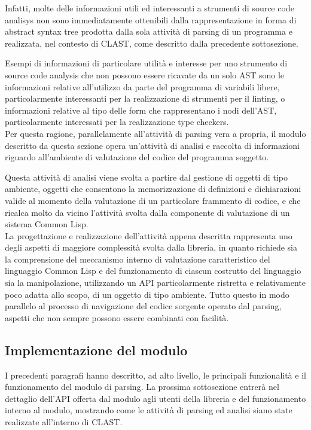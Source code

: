 Infatti, molte delle informazioni utili ed interessanti a strumenti di source
code analisys non sono immediatamente ottenibili dalla rappresentazione in forma
di abstract syntax tree prodotta dalla sola attività di parsing di un programma
e realizzata, nel contesto di CLAST, come descritto dalla precedente
sottosezione.

Esempi di informazioni di particolare utilità e interesse per uno strumento di
source code analysis che non possono essere ricavate da un solo AST sono le
informazioni relative all'utilizzo da parte del programma di variabili libere,
particolarmente interessanti per la realizzazione di strumenti per il linting, o
informazioni relative al tipo delle form che rappresentano i nodi dell'AST,
particolarmente interessati per la realizzazione type checkers.\\

Per questa ragione, parallelamente all'attività di parsing vera a propria, il
modulo descritto da questa sezione opera un'attività di analisi e raccolta di
informazioni riguardo all'ambiente di valutazione del codice del programma
soggetto.

Questa attività di analisi viene svolta a partire dal gestione di oggetti di
tipo ambiente, oggetti che consentono la memorizzazione di definizioni e
dichiarazioni valide al momento della valutazione di un particolare frammento di
codice, e che ricalca molto da vicino l’attività svolta dalla componente di
valutazione di un sistema Common Lisp.\\

La progettazione e realizzazione dell'attività appena descritta rappresenta uno
degli aspetti di maggiore complessità svolta dalla libreria, in quanto richiede
sia la comprensione del meccanismo interno di valutazione caratteristico del
linguaggio Common Lisp e del funzionamento di ciascun costrutto del linguaggio
sia la manipolazione, utilizzando un API particolarmente ristretta e
relativamente poco adatta allo scopo, di un oggetto di tipo ambiente. Tutto
questo in modo parallelo al processo di navigazione del codice sorgente operato
dal parsing, aspetti che non sempre possono essere combinati con facilità.

\subsection{Implementazione del modulo}

I precedenti paragrafi hanno descritto, ad alto livello, le principali
funzionalità e il funzionamento del modulo di parsing. La prossima sottosezione
entrerà nel dettaglio dell'API offerta dal modulo agli utenti della libreria e
del funzionamento interno al modulo, mostrando come le attività di parsing ed
analisi siano state realizzate all'interno di CLAST.

